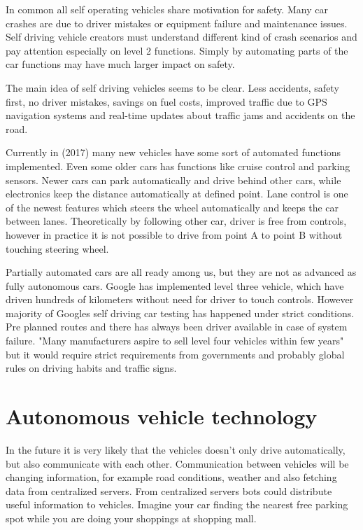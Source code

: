 \documentclass[english]{tktltiki}
\begin{document}
In common all self operating vehicles share motivation for safety. \cite{heavyvehicle} Many car 
crashes are due to driver mistakes or equipment failure and maintenance issues. 
Self driving vehicle creators must understand different kind of crash scenarios 
and pay attention especially on level 2 functions. Simply by automating parts of 
the car functions may have much larger impact on safety.

The main idea of self driving vehicles seems to be clear. Less accidents, safety 
first, no driver mistakes, savings on fuel costs, improved traffic due to GPS 
navigation systems and real-time updates about traffic jams and accidents on the 
road.

Currently in (2017) many new vehicles have some sort of automated functions 
implemented. Even some older cars has functions like cruise control and parking 
sensors. Newer cars can park automatically and drive behind other cars, while 
electronics keep the distance automatically at defined point. Lane control is 
one of the newest features which steers the wheel automatically and keeps the 
car between lanes. Theoretically by following other car, driver is free from 
controls, however in practice it is not possible to drive from point A to point 
B without touching steering wheel.

Partially automated cars are all ready among us, but they are not as advanced as 
fully autonomous cars. Google has implemented level three vehicle, which have 
driven hundreds of kilometers without need for driver to touch controls. However 
majority of Googles self driving car testing has happened under strict 
conditions. Pre planned routes and there has always been driver available in 
case of system failure. \cite{transportpolicy} "Many manufacturers aspire to 
sell level four vehicles within few years" \cite{transportpolicy} but it would 
require strict requirements from governments and probably global rules on 
driving habits and traffic signs.   


\section{Autonomous vehicle technology}

In the future it is very likely that the vehicles doesn't only drive 
automatically, but also communicate with each other. \cite{trafficmodels} 
Communication between vehicles will be changing information, for example road 
conditions, weather and also fetching data from centralized servers. From 
centralized servers bots could distribute useful information to vehicles. 
Imagine your car finding the nearest free parking spot while you are doing your 
shoppings at shopping mall. 
\end{document}
